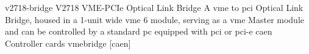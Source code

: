 \newglsXequipment%
{v2718-bridge}%
{V2718 VME{\--}PCIe Optical Link Bridge}%
{A \gls{vme} to \gls{pci} Optical Link Bridge, housed in a 1-unit wide \gls{vme} \SI{6}{\rackunit} module, serving as a \gls{vme} Master module and can be controlled by a standard \gls{pc} equipped with \gls{pci} or \gls{pci-e} \gls{caen} Controller cards}%
{vmebridge}%
[caen]%